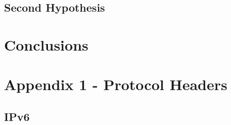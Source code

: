 \documentclass[12pt]{article}
\begin{document}
\subsection{Second Hypothesis}
\label{resultsSecondHypothesis}



\pagebreak

\section{Conclusions}
\label{sec:7}

\pagebreak








\pagebreak


\appendix

\section{Appendix 1 - Protocol Headers}
\label{Appendix 1}

\subsection*{IPv6}
\end{document}
